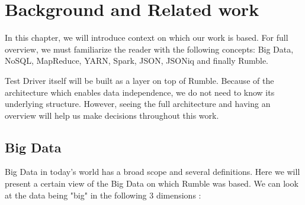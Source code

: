 \chapter{Background and Related work}
In this chapter, we will introduce context on which our work is based. For full overview, we must familiarize the reader with the following concepts: Big Data, NoSQL, MapReduce, YARN, Spark, JSON, JSONiq and finally Rumble.

Test Driver itself will be built as a layer on top of Rumble. Because of the architecture which enables data independence, we do not need to know its underlying structure. However, seeing the full architecture and having an overview will help us make decisions throughout this work.

\section{Big Data}
Big Data in today's world has a broad scope and several definitions. Here we will present a certain view of the Big Data on which Rumble was based. We can look at the data being "big" in the following 3 dimensions \cite{BigDataCourse}:%
